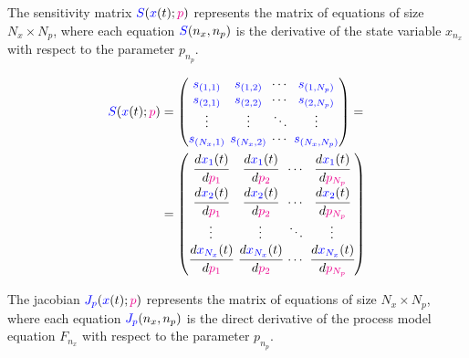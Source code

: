 \documentclass[../Article_Model_Parameters.tex]{subfiles}
\begin{document}
	The sensitivity matrix ${\color{blue}S}({\color{blue}x}(t);{\color{magenta}p})$ represents the matrix of equations of size $N_x \times N_p$, where each equation ${\color{blue}S}(n_x,n_p)$ is the derivative of the state variable $x_{n_x}$ with respect to the parameter $p_{n_p}$.
	
	{\footnotesize
		\begin{equation}
			\begin{split}
				{\color{blue}S}({\color{blue}x}(t);{\color{magenta}p}) & = 
				\begingroup %
				\setlength\arraycolsep{2pt}
				\begin{pmatrix}
					{\color{blue}s_{({1,1})}} & {\color{blue}s_{({1,2})}} & \cdots & {\color{blue}s_{({1,N_p})}}\\
					{\color{blue}s_{({2,1})}} & {\color{blue}s_{({2,2})}} & \cdots & {\color{blue}s_{({2,N_p})}}\\
					\vdots & \vdots & \ddots & \vdots\\
					{\color{blue}s_{({N_x,1})}} & {\color{blue}s_{({N_x,2})}} & \cdots & {\color{blue}s_{({N_x,N_p})}}\\
				\end{pmatrix}
				\endgroup
				=\\
				&=
				\begingroup %
				\setlength\arraycolsep{2pt}
				\begin{pmatrix}
					\cfrac{d {\color{blue}x_{1}}(t)}{d {\color{magenta}p_{1}}} 	& \cfrac{d {\color{blue}x_{1}}(t)}{d {\color{magenta}p_{2}}}     & \cdots & \cfrac{d {\color{blue}x_{1}}(t)}{d {\color{magenta}p_{N_p}}}\\
					\cfrac{d {\color{blue}x_{2}}(t)}{d {\color{magenta}p_{1}}} 	& \cfrac{d {\color{blue}x_{2}}(t)}{d {\color{magenta}p_{2}}}     & \cdots & \cfrac{d {\color{blue}x_{2}}(t)}{d {\color{magenta}p_{N_p}}}\\
					\vdots					 	    & \vdots 					   	  & \ddots & \vdots\\
					\cfrac{d {\color{blue}x_{N_x}}(t)}{d {\color{magenta}p_{1}}} 	& \cfrac{d {\color{blue}x_{N_x}}(t)}{d {\color{magenta}p_{2}}}     & \cdots & \cfrac{d {\color{blue}x_{N_x}}(t)}{d {\color{magenta}p_{N_p}}}
				\end{pmatrix} 
				\endgroup
			\end{split}
	\end{equation} }
	
	The jacobian ${\color{blue}J_p}({\color{blue}x}(t);{\color{magenta}p})$ represents the matrix of equations of size $N_x \times N_p$, where each equation ${\color{blue}J_p}(n_x,n_p)$ is the direct derivative of the process model equation $F_{n_x}$ with respect to the parameter $p_{n_p}$.
	
\end{document}

